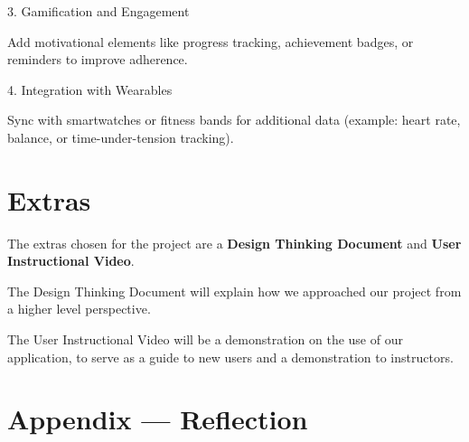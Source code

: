 \documentclass{article}
\begin{document}
3. Gamification and Engagement

Add motivational elements like progress tracking, achievement badges, or reminders to improve adherence.

4. Integration with Wearables

Sync with smartwatches or fitness bands for additional data (example: heart rate, balance, or time-under-tension tracking).


\section{Extras}

The extras chosen for the project are a \textbf{Design Thinking Document}
and \textbf{User Instructional Video}.

The Design Thinking Document will explain how we approached our project
from a higher level perspective.

The User Instructional Video will be a demonstration on the use of our
application, to serve as a guide to new users and a demonstration to
instructors.

\newpage{}

\section*{Appendix --- Reflection}




\end{document}
